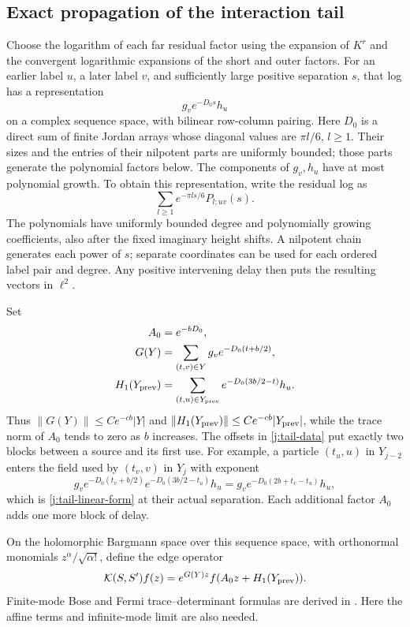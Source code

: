 \subsection{Exact propagation of the interaction tail}

Choose the logarithm of each far residual factor using the expansion of
$K^r$ and the convergent logarithmic expansions of the short and outer
factors. For an earlier label $u$, a later label $v$, and sufficiently
large positive separation $s$, that log has a representation
\begin{equation}\label{j:tail-linear-form}
 g_v e^{-D_0s}h_u
\end{equation}
on a complex sequence space, with bilinear row-column pairing. Here
$D_0$ is a direct sum of finite Jordan arrays whose diagonal values are
$\pi l/6$, $l\ge1$. Their sizes and the entries of their nilpotent parts
are uniformly bounded; those parts generate the polynomial factors below. The components
of $g_v,h_u$ have at most polynomial growth.
To obtain this representation, write the residual log as
\[
 \sum_{l\ge1}e^{-\pi l s/6}P_{l;uv}(s).
\]
The polynomials have uniformly bounded degree and polynomially growing
coefficients, also after the fixed imaginary height shifts. A nilpotent
chain generates each power of $s$; separate coordinates can be used for
each ordered label pair and degree. Any positive intervening delay then
puts the resulting vectors in $\ell^2$.

Set
\begin{equation}\label{j:tail-data}
 \begin{split}
 A_0&=e^{-bD_0},\\
 G(Y)&=\sum_{(t,v)\in Y}g_v e^{-D_0(t+b/2)},\\
 H_1(Y_{\rm prev})&=\sum_{(t,u)\in Y_{\rm prev}}
                    e^{-D_0(3b/2-t)}h_u.
 \end{split}
\end{equation}
Thus $\|G(Y)\|\le Ce^{-cb}|Y|$ and
$\|H_1(Y_{\rm prev})\|\le Ce^{-cb}|Y_{\rm prev}|$, while the trace norm
of $A_0$ tends to zero as $b$ increases. The offsets in
\eqref{j:tail-data} put exactly two blocks between a source and its first
use. For example, a particle $(t_u,u)$ in $Y_{j-2}$ enters the field used
by $(t_v,v)$ in $Y_j$ with exponent
\[
 g_v e^{-D_0(t_v+b/2)}e^{-D_0(3b/2-t_u)}h_u
 =g_v e^{-D_0(2b+t_v-t_u)}h_u,
\]
which is \eqref{j:tail-linear-form} at their actual separation. Each
additional factor $A_0$ adds one more block of delay.

On the holomorphic Bargmann space over this sequence space, with
orthonormal monomials $z^\alpha/\sqrt{\alpha!}$, define the edge operator
\begin{equation}\label{j:bargmann-edge}
 \mathcal K(S,S')f(z)=e^{G(Y)z}f(A_0z+H_1(Y_{\rm prev})).
\end{equation}
Finite-mode Bose and Fermi trace--determinant formulas are derived in
\cite[Section~2]{Klich2002}. Here the affine terms and infinite-mode limit
are also needed.

